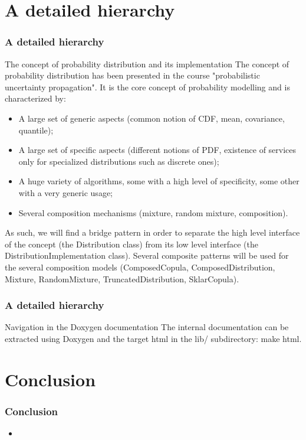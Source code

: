 \documentclass[8pt]{beamer}
\begin{document}
\section[A detailed hierarchy]{A detailed hierarchy}
\begin{frame}
  \frametitle{A detailed hierarchy}
  \begin{block}{The concept of probability distribution and its implementation}
    The concept of probability distribution has been presented in the course "probabilistic uncertainty propagation". It is the core concept of probability modelling and is characterized by:
    \begin{itemize}
    \item A large set of generic aspects (common notion of CDF, mean, covariance, quantile);
    \item A large set of specific aspects (different notions of PDF, existence of services only for specialized distributions such as discrete ones);
    \item A huge variety of algorithms, some with a high level of specificity, some other with a very generic usage;
    \item Several composition mechanisms (mixture, random mixture, composition).
    \end{itemize}
  \end{block}
  As such, we will find a bridge pattern in order to separate the \alert{high level interface} of the concept (the \alert{Distribution class}) from its \alert{low level interface} (the \alert{DistributionImplementation class}). Several composite patterns will be used for the several composition models (ComposedCopula, ComposedDistribution, Mixture, RandomMixture, TruncatedDistribution, SklarCopula).
\end{frame}
\begin{frame}
  \frametitle{A detailed hierarchy}
  \begin{block}{Navigation in the Doxygen documentation}
    The internal documentation can be extracted using Doxygen and the target {\ttfamily html} in the lib/ subdirectory: make html.
  \end{block}
\end{frame}
\section[]{Conclusion}
\begin{frame}
  \Large
  \frametitle{Conclusion}
  \begin{itemize}
  \item 
  \end{itemize}
\end{frame}
\end{document}

